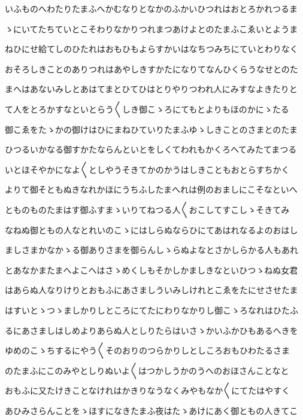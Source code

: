 \documentclass[a4paper,11pt,landscape]{ltjtarticle}
\begin{document}
\par\medskip
いふものへわたりたまふへかむなりとなかのふかいひつれはおとろかれつるま
\par\medskip
ゝにいてたちていとこそわりなかりつれまつあけよとのたまふこゑいとようま
\par\medskip
ねひにせ給てしのひたれはおもひもよらすかいはなちつみちにていとわりなく
\par\medskip
おそろしきことのありつれはあやしきすかたになりてなんひくらうなせとのた
\par\medskip
まへはあないみしとあはてまとひてひはとりやりつわれ人にみすなよきたりと
\par\medskip
て人をとろかすなといとらう〱しき御こゝろにてもとよりもほのかにゝたる
\par\medskip
御こゑをたゝかの御けはひにまねひていりたまふゆゝしきことのさまとのたま
\par\medskip
ひつるいかなる御すかたならんといとをしくてわれもかくろへてみたてまつる
\par\medskip
いとほそやかになよ〱としやうそきてかのかうはしきこともおとらすちかく
\par\medskip
よりて御そともぬきなれかほにうちふしたまへれは例のおましにこそなといへ
\par\medskip
とものものたまはす御ふすまゝいりてねつる人〱おこしてすこしゝそきてみ
\par\medskip
なねぬ御ともの人なとれいのこゝにはしらぬならひにてあはれなるよのおはし
\par\medskip
ましさまかなかゝる御ありさまを御らんしゝらぬよなとさかしらかる人もあれ
\par\medskip
とあなかまたまへよこへはさゝめくしもそかしかましきなといひつゝねぬ女君
\par\medskip
はあらぬ人なりけりとおもふにあさましういみしけれとこゑをたにせさせたま
\par\medskip
はすいとゝつゝましかりしところにてたにわりなかりし御こゝろなれはひたふ
\par\medskip
るにあさましはしめよりあらぬ人としりたらはいさゝかいふかひもあるへきを
\par\medskip
ゆめのこゝちするにやう〱そのおりのつらかりしとしころおもひわたるさま
\par\medskip
のたまふにこのみやとしりぬいよ〱はつかしうかのうへのおほさんことなと
\par\medskip
おもふに又たけきことなけれはかきりなうなくみやもなか〱にてたはやすく
\par\medskip
あひみさらんことをゝほすになきたまふ夜はたゝあけにあく御ともの人きてこ
\par\medskip
\end{document}

